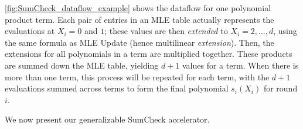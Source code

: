 \autoref{fig:SumCheck_dataflow_example} shows the dataflow for one polynomial product term.
Each pair of entries in an MLE table actually represents the evaluations at $X_i = 0$ and $1$; these values are then \textit{extended} to $X_i = 2, \ldots, d$, using the same formula as MLE Update (hence multilinear \textit{extension}).
Then, the extensions for all polynomials in a term are multiplied together.
These products are summed down the MLE table, yielding $d+1$ values for a term.
When there is more than one term, 
this process will be repeated for each term, with the $d+1$ evaluations summed across terms to form the final polynomial $s_i(X_i)$ for round $i$.

We now present our generalizable SumCheck accelerator.




